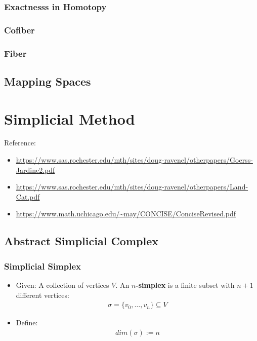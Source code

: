 \documentclass[Total.tex]{subfiles}
\begin{document}
			\subsection{Exactnesss in Homotopy}
			\subsection{Cofiber}
			\subsection{Fiber}
		\section{Mapping Spaces}
		
	\chapter{Simplicial Method}
		Reference:
		\begin{itemize}
			\item \url{ https://www.sas.rochester.edu/mth/sites/doug-ravenel/otherpapers/Goerss-Jardine2.pdf}
			\item \url{ https://www.sas.rochester.edu/mth/sites/doug-ravenel/otherpapers/Land-Cat.pdf}
			\item \url{https://www.math.uchicago.edu/~may/CONCISE/ConciseRevised.pdf}
		\end{itemize}
	
		\section{Abstract Simplicial Complex}
			\subsection{Simplicial Simplex}
				\begin{Def}
					\begin{itemize}
						\item 
						Given: A collection of vertices $V$. An \textbf{$n$-simplex} is a finite subset with $n+1$ different vertices:
						\begin{gather*}
							\sigma=\{v_0,\dots,v_n\}\subseteq V
						\end{gather*}
						\item Define:
						\begin{gather*}
							dim(\sigma):=n
						\end{gather*}
					\end{itemize}
				\end{Def}
				
\end{document}
